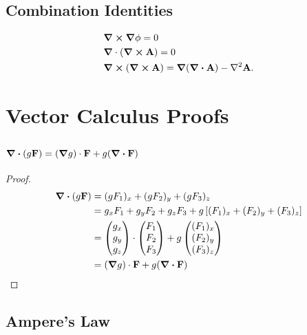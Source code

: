 \documentclass{book}
\begin{document}
\section{Combination Identities}
\begin{align}
    & \grad \cross \grad\phi = 0 \\
    & \grad \cdot (\curl{\vb{A}}) = 0 \\
    & \curl{(\curl{\vb{A}})} = \grad(\div{\vb{A}}) - \nabla^2\vb{A}.
\end{align}
\chapter{Vector Calculus Proofs}
\section{$\div{(g\vb{F})} = (\grad g)\cdot \vb{F} + g(\div{\vb{F}})$}
\begin{proof}
    \begin{equation*}
        \begin{split}
            \div{(g\vb{F})} & = (gF_1)_x + (gF_2)_y + (gF_3)_z \\
            & = g_xF_1 + g_y F_2 + g_z F_3 + g\left[(F_1)_x + (F_2)_y + (F_3)_z\right] \\
            & = \begin{pmatrix}
                g_x \\ g_y \\ g_z
            \end{pmatrix} \cdot \begin{pmatrix}
                F_1 \\ F_2 \\ F_3
            \end{pmatrix} + g\begin{pmatrix}
                (F_1)_x \\ (F_2)_y \\ (F_3)_z 
            \end{pmatrix}\\
            & = (\grad g)\cdot \vb{F} + g(\div{\vb{F}})
        \end{split}
    \end{equation*}
\end{proof}
\section{Ampere's Law}
\end{document}
